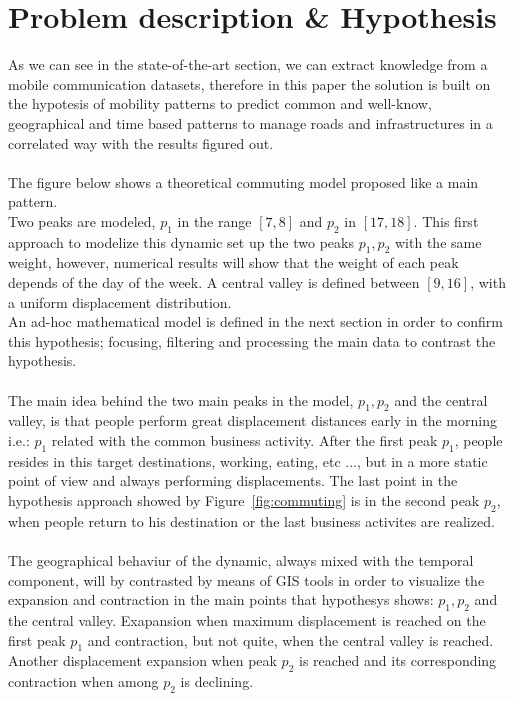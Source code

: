\newpage

\section{Problem description \& Hypothesis}
As we can see in the state-of-the-art section, we can extract knowledge from a mobile communication datasets, therefore in this paper the solution is built on the hypotesis of mobility patterns to predict common and well-know, geographical and time based patterns to manage roads and infrastructures in a correlated way with the results figured out.
\\
\\
The figure below shows a theoretical commuting model proposed like a main pattern. 
\\
Two peaks are modeled, $p_1$ in the range $[7, 8]$ and $p_2$ in $[17, 18]$. This first approach to modelize this dynamic set up the two peaks $p_1, p_2$ with the same weight, however, numerical results will show that the weight of each peak depends of the day of the week. A central valley is defined between $[9, 16]$, with a uniform displacement distribution.
\\
An ad-hoc mathematical model is defined in the next section in order to confirm this hypothesis; focusing, filtering and processing the main data to contrast the hypothesis.
\\
\\
The main idea behind the two main peaks in the model, $p_1, p_2$ and the central valley, is that people perform great displacement distances early in the morning i.e.: $p_1$ related with the common business activity. After the first peak $p_1$, people resides in this target destinations, working, eating, etc ..., but in a more static point of view and always performing displacements. The last point in the hypothesis approach showed by Figure~\ref{fig:commuting} is in the second peak $p_2$, when people return to his destination or the last business activites are realized.
\\
\\
The geographical behaviur of the dynamic, always mixed with the temporal component, will by contrasted by means of GIS tools in order to visualize the expansion and contraction in the main points that hypothesys shows: $p_1, p_2$ and the central valley. Exapansion when maximum displacement is reached on the first peak $p_1$ and contraction, but not quite,  when the central valley is reached. Another displacement expansion when peak $p_2$ is reached and its corresponding contraction when among $p_2$ is declining.


